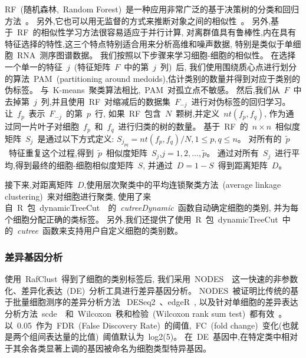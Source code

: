 RF~(随机森林,~Random Forest)~是一种应用非常广泛的基于决策树的分类和回归方法~\cite{breiman2001random}。
另外,它也可以用无监督的方式来推断对象之间的相似性~\cite{shi2006unsupervised,breiman2011manual,pouyan2018random}。
另外,基于~RF~的相似性学习方法很容易适应于并行计算,
对离群值具有鲁棒性,内在具有特征选择的特性,这三个特点特别适合用来分析高维和噪声数据,
特别是类似于单细胞~RNA~测序图谱数据。
我们按照以下步骤来学习细胞-细胞的相似性。
在选择一个单一的特征~$j$~(特征矩阵~$F$~中的第~$j$~列)~后, 
我们使用围绕质心点进行划分的算法~PAM~(partitioning around medoids),估计类别的数量并得到对应于类别的伪标签。
与~K-means~聚类算法相比,~PAM~对孤立点不敏感。
然后,我们从~$F$~中去掉第~$j$~列,并且使用~RF~对缩减后的数据集~$F_{-j}$~进行对伪标签的回归学习。
让~$f_p$~表示~$F_{-j}$~的第~$p$~行,
如果~RF~包含~$N$~颗树,并定义~$nt(f_p,f_q)$, 作为通过同一片叶子对细胞~$f_p$~和~$f_q$~进行归类的树的数量。
基于~RF~的~$n \times n$~相似度矩阵~$S_j$~是通过以下方式定义:
$S_{j_{pq}} = nt(f_p,f_q) / N, 1 \le p,q \le n$。
对所有的~$\tilde{p}$~特征重复这个过程,得到~$\tilde{p}$~相似度矩阵~$S_j$,$j=1,2,\ldots,\tilde{p}$。
通过对所有~$S_j$~进行平均,得到最终的细胞-细胞相似度矩阵~$S$,
并通过~$D=1-S$~得到距离矩阵~$D$。

接下来,对距离矩阵~$D$,使用层次聚类中的平均连锁聚类方法~(average linkage clustering)~来对细胞进行聚类,
使用了来自~R~包~dynamicTreeCut~\cite{langfelder2007defining,package-dynamicTreeCut}~的~\textit{cutreeDynamic}~函数自动确定细胞的类别,
并为每个细胞分配正确的类标签。
另外,我们还提供了使用~R~包~dynamicTreeCut~中的~\textit{cutree}~函数来支持用户自定义细胞的类别数。

\subsubsection{差异基因分析}
\label{subsec:de}

使用~RafClust~得到了细胞的类别标签后,
我们采用~NODES~\cite{Sengupta049734}~这一快速的非参数化、差异化表达~(DE)~分析工具进行差异基因分析。
NODES~被证明比传统的基于批量细胞测序的差异分析方法~DESeq2~\cite{love2014moderated}、edgeR~\cite{robinson2010edger},
以及针对单细胞的差异表达分析方法~scde~\cite{kharchenko2014bayesian}~和~Wilcoxon~秩和检验~(Wilcoxon rank sum test)~都有效~\cite{Sengupta049734}。
以~0.05~作为~FDR~(False Discovery Rate)~的阈值,~FC~(fold change)~变化(也就是两个组间表达量的比值)~阈值默认为~log2(5)。
在~DE~基因中,在特定类中相对于其余各类显著上调的基因被命名为细胞类型特异基因。



